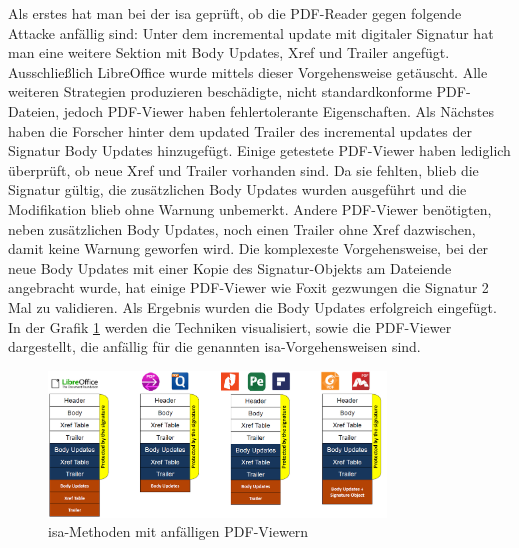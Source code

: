Als erstes hat man bei der \gls{isa} geprüft, ob die PDF-Reader gegen folgende Attacke anfällig sind: Unter dem incremental update mit digitaler Signatur hat man eine weitere Sektion mit Body Updates, Xref und Trailer angefügt. Ausschließlich LibreOffice wurde mittels dieser Vorgehensweise getäuscht. Alle weiteren Strategien produzieren beschädigte, nicht standardkonforme PDF-Dateien, jedoch PDF-Viewer haben fehlertolerante Eigenschaften. Als Nächstes haben die Forscher hinter dem updated Trailer des incremental updates der Signatur Body Updates hinzugefügt. Einige getestete PDF-Viewer haben lediglich überprüft, ob neue Xref und Trailer vorhanden sind. Da sie fehlten, blieb die Signatur gültig, die zusätzlichen Body Updates wurden ausgeführt und die Modifikation blieb ohne Warnung unbemerkt. Andere PDF-Viewer benötigten, neben zusätzlichen Body Updates, noch einen Trailer ohne Xref dazwischen, damit keine Warnung geworfen wird. Die komplexeste Vorgehensweise, bei der neue Body Updates mit einer Kopie des Signatur-Objekts am Dateiende angebracht wurde, hat einige PDF-Viewer wie Foxit gezwungen die Signatur 2 Mal zu validieren. Als Ergebnis wurden die Body Updates erfolgreich eingefügt. In der Grafik \ref{fig:isa} werden die Techniken visualisiert, sowie die PDF-Viewer dargestellt, die anfällig für die genannten \gls{isa}-Vorgehensweisen sind.

\begin{figure}[!htbp]
	\centering
	\includegraphics[width=0.8\textwidth]{"images/isa.png"}
	\caption{\gls{isa}-Methoden mit anfälligen PDF-Viewern \cite{ccc-break-pdf-slides}}
	\label{fig:isa}
\end{figure}

